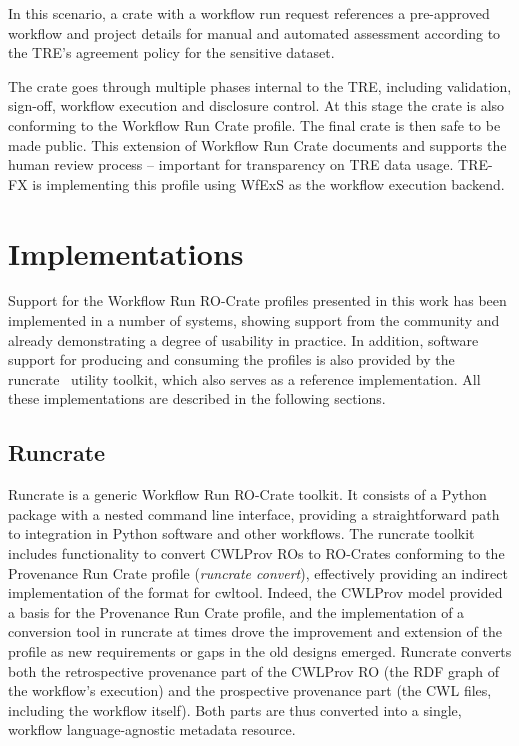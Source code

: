 \documentclass[10pt,letterpaper]{article}
\begin{document}
In this scenario, a crate with a workflow run request references a pre-approved workflow and project details for manual and automated assessment according to the TRE's agreement policy for the sensitive dataset.

The crate goes through multiple phases internal to the TRE, including validation, sign-off, workflow execution and disclosure control.
At this stage the crate is also conforming to the Workflow Run Crate profile.
The final crate is then safe to be made public.
This extension of Workflow Run Crate documents and supports the human review process --
important for transparency on TRE data usage.
TRE-FX is implementing this profile using WfExS as the workflow execution backend.



\section{Implementations}\label{implementations}

Support for the Workflow Run RO-Crate profiles presented in this work has been implemented in a number of systems, showing support from the community and already demonstrating a degree of usability in practice.
In addition, software support for producing and consuming the profiles is also provided by the runcrate~\cite{Leo 2023a} utility toolkit, which also serves as a reference implementation.
All these implementations are described in the following sections.


\subsection{Runcrate}\label{runcrate}

Runcrate is a generic Workflow Run RO-Crate toolkit.
It consists of a Python package with a nested command line interface, providing a straightforward path to integration in Python software and other workflows.
The runcrate toolkit includes functionality to convert CWLProv ROs to RO-Crates conforming to the Provenance Run Crate profile (\emph{runcrate convert}), effectively providing an indirect implementation of the format for cwltool.
Indeed, the CWLProv model provided a basis for the Provenance Run Crate profile, and the implementation of a conversion tool in runcrate at times drove the improvement and extension of the profile as new requirements or gaps in the old designs emerged.
Runcrate converts both the retrospective provenance part of the CWLProv RO (the RDF graph of the workflow's execution) and the prospective provenance part (the CWL files, including the workflow itself).
Both parts are thus converted into a single, workflow language-agnostic metadata resource.
\end{document}
